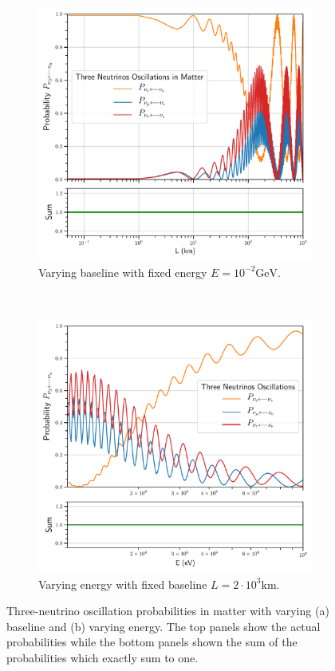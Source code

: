 \documentclass[twocolumn,secnumarabic,amssymb, nobibnotes, aps, prd,10pt]{revtex4-1}
\begin{document}
\begin{figure}
\captionsetup[subfigure]{aboveskip=-1.5pt,belowskip=-1.5pt} 
\begin{subfigure}{1.05\linewidth}
\includegraphics[width=\linewidth]{Osc3MatterBaseline.pdf}
\caption{Varying baseline with fixed energy $E=10^{-2} \mathrm{GeV}$.} 
\label{higgs:sspt} 
\end{subfigure} 
\\
\begin{subfigure}{1.05\linewidth}
\includegraphics[width=\linewidth]{Osc3MatterEnergy.pdf}
\caption{Varying energy with fixed baseline $L=2 \cdot 10^3 \mathrm{km}$.} 
\label{fig:matter} 
\end{subfigure}
\caption{Three-neutrino oscillation probabilities in matter with varying (a) baseline
and (b) varying energy. The top panels show the actual probabilities while the bottom
panels shown the sum of the probabilities which exactly sum to one.}
\end{figure}
\end{document}
